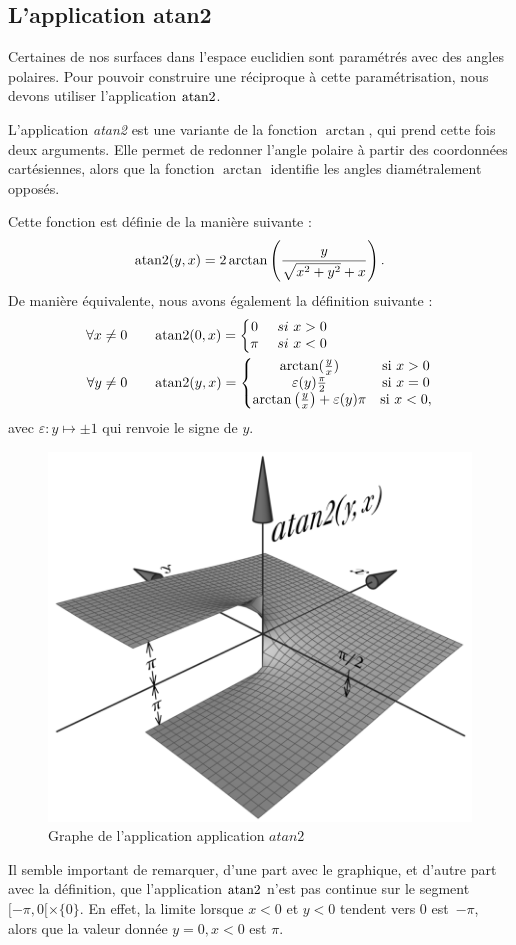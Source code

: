 \documentclass[hidelinks, 10pt]{article}
\begin{document}
\subsection{L'application atan2}

Certaines de nos surfaces dans l'espace euclidien sont paramétrés avec des angles polaires. Pour pouvoir construire une réciproque à cette paramétrisation, nous devons utiliser l'application $\mathrm{atan}2$.

L'application \emph{atan2} est une variante de la fonction $\arctan$, qui prend cette fois deux arguments. Elle permet de redonner l'angle polaire à partir des coordonnées cartésiennes, alors que la fonction $\arctan$ identifie les angles diamétralement opposés.

Cette fonction est définie de la manière suivante : \[\mathrm{atan}2(y,x)=2\arctan\left(\frac{y}{\sqrt{x^2+y^2}+x}\right).\]De manière équivalente, nous avons également la définition suivante :\begin{equation}\label{eq:atan2}
\begin{split}
\forall x\neq 0&\qquad \mathrm{atan}2(0,x)=\left\{\begin{matrix}
0&\ si\ x>0\\ 
\pi &\ si\  x<0
\end{matrix}\right.\\
\forall y\neq 0&\qquad \mathrm{atan}2(y,x)=\left\{\begin{matrix}
\arctan(\frac{y}{x})&\text{si}\ x>0\\ 
\varepsilon(y)\frac{\pi}{2}&\text{si}\ x=0\\
\arctan\left(\frac{y}{x}\right) +\varepsilon(y) \pi&\text{si}\  x<0,
\end{matrix}\right.
\end{split}
\end{equation}avec $\varepsilon:y\mapsto\pm1$ qui renvoie le signe de $y$.

\begin{figure}[H]
    \centering
    \includegraphics[width=0.55\linewidth]{pictures/atan2Diagram.png}
    \caption{Graphe de l'application application $atan2$}
    \label{fig:graph-atan2}
\end{figure}
Il semble important de remarquer, d'une part avec le graphique, et d'autre part avec la définition, que l'application $\mathrm{atan}2$ n'est pas continue sur le segment~$[-\pi,0[\times\{0\}$. En effet, la limite lorsque $x<0$ et $y<0$ tendent vers 0 est~$-\pi$, alors que la valeur donnée $y=0,x<0$ est $\pi$.
\end{document}
